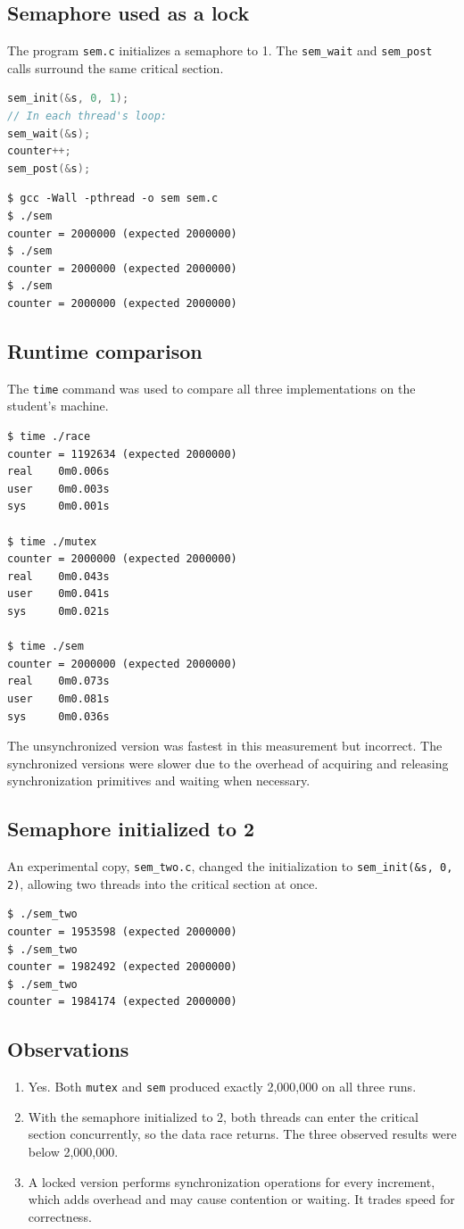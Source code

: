 \documentclass[12pt,a4paper]{article}
\begin{document}
\subsection{Semaphore used as a lock}
The program \texttt{sem.c} initializes a semaphore to 1. The \texttt{sem\_wait} and \texttt{sem\_post} calls surround the same critical section.
\begin{lstlisting}[language=C]
sem_init(&s, 0, 1);
// In each thread's loop:
sem_wait(&s);
counter++;
sem_post(&s);
\end{lstlisting}
\begin{lstlisting}
$ gcc -Wall -pthread -o sem sem.c
$ ./sem
counter = 2000000 (expected 2000000)
$ ./sem
counter = 2000000 (expected 2000000)
$ ./sem
counter = 2000000 (expected 2000000)
\end{lstlisting}
\subsection{Runtime comparison}
The \texttt{time} command was used to compare all three implementations on the student's machine.
\begin{lstlisting}
$ time ./race
counter = 1192634 (expected 2000000)
real    0m0.006s
user    0m0.003s
sys     0m0.001s

$ time ./mutex
counter = 2000000 (expected 2000000)
real    0m0.043s
user    0m0.041s
sys     0m0.021s

$ time ./sem
counter = 2000000 (expected 2000000)
real    0m0.073s
user    0m0.081s
sys     0m0.036s
\end{lstlisting}
The unsynchronized version was fastest in this measurement but incorrect. The synchronized versions were slower due to the overhead of acquiring and releasing synchronization primitives and waiting when necessary.
\subsection{Semaphore initialized to 2}
An experimental copy, \texttt{sem\_two.c}, changed the initialization to \texttt{sem\_init(\&s, 0, 2)}, allowing two threads into the critical section at once.
\begin{lstlisting}
$ ./sem_two
counter = 1953598 (expected 2000000)
$ ./sem_two
counter = 1982492 (expected 2000000)
$ ./sem_two
counter = 1984174 (expected 2000000)
\end{lstlisting}
\subsection{Observations}
\begin{enumerate}[label=\arabic*.]
\item Yes. Both \texttt{mutex} and \texttt{sem} produced exactly 2,000,000 on all three runs.
\item With the semaphore initialized to 2, both threads can enter the critical section concurrently, so the data race returns. The three observed results were below 2,000,000.
\item A locked version performs synchronization operations for every increment, which adds overhead and may cause contention or waiting. It trades speed for correctness.
\end{enumerate}
\end{document}
